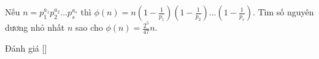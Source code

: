 \ifshowproblem
\begin{problem}\label{problem:CHN-2015-NMO-10-P3}
    Nếu $n = p_1^{a_1} p_2^{a_2} \ldots p_s^{a_s}$ thì $\phi(n) = n \left(1 - \frac{1}{p_1}\right)\left(1 - \frac{1}{p_2}\right)\ldots\left(1 - \frac{1}{p_s}\right)$.
    Tìm số nguyên dương nhỏ nhất $n$ sao cho $\phi(n) = \frac{2^5}{47}n.$
\end{problem}
\fi

\ifshowinfo
Đánh giá [\textbf{}]\footnotemark
{}
\fi